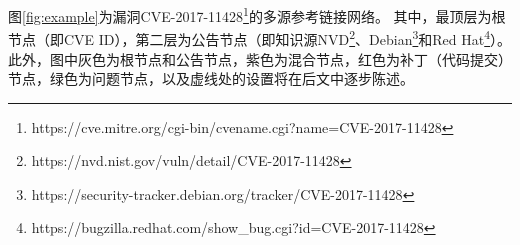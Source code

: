
\begin{exmp}
图\ref{fig:example}为漏洞CVE-2017-11428\footnote{https://cve.mitre.org/cgi-bin/cvename.cgi?name=CVE-2017-11428}的多源参考链接网络。 其中，最顶层为根节点（即CVE ID），第二层为公告节点（即知识源NVD\footnote{https://nvd.nist.gov/vuln/detail/CVE-2017-11428}、Debian\footnote{https://security-tracker.debian.org/tracker/CVE-2017-11428}和Red Hat\footnote{https://bugzilla.redhat.com/show\_bug.cgi?id=CVE-2017-11428}）。此外，图中灰色为根节点和公告节点，紫色为混合节点，红色为补丁（代码提交）节点，绿色为问题节点，以及虚线处的设置将在后文中逐步陈述。
\end{exmp}

